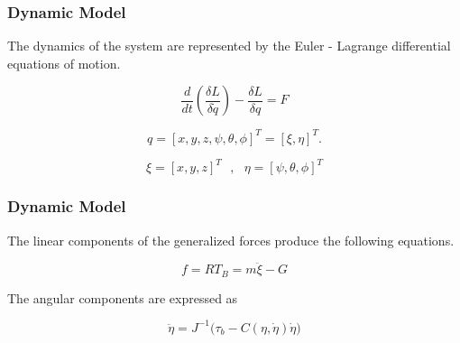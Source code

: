\documentclass{beamer}
\begin{document}

\begin{frame}
\frametitle{Dynamic Model}

\noindent The dynamics of the system are represented by the Euler - Lagrange differential equations of motion.

\begin{equation}
    \frac{d}{dt} \left( \frac{\delta  L} {\delta \dot{q}}\right) - \frac{\delta  L}{\delta q}=F
\end{equation}

\begin{equation}
 q = [x,y,z,\psi ,\theta ,\phi ]^T = [ \xi , \eta ]^T  .
\end{equation}

\begin{equation}
  \xi  = [x,y,z]^T  \text{ } , \text{ }
  \eta = [\psi ,\theta ,\phi]^T
\end{equation}

\end{frame}




\begin{frame}
\frametitle{Dynamic Model}

\noindent The linear components of the generalized forces produce the following equations.

\begin{equation}
    \label{linforce}
    f =  R  T_B = m \ddot{ \xi} -  G
\end{equation}


\noindent The angular components are expressed as

\begin{equation}
    \label{eq:angularacc}
    \ddot{\eta} = J^{-1} \big( \tau_b - C(\eta,\dot{\eta}) \dot{\eta} \big)
\end{equation}



\end{frame}



\end{document}
